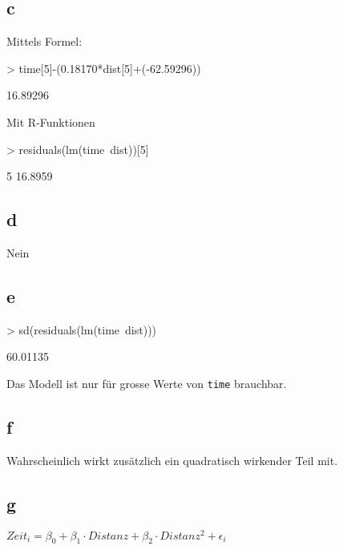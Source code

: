 \subsection{c}
Mittels Formel: 
\begin{Schunk}
\begin{Sinput}
> time[5]-(0.18170*dist[5]+(-62.59296))
\end{Sinput}
\begin{Soutput}
[1] 16.89296
\end{Soutput}
\end{Schunk}
Mit R-Funktionen
\begin{Schunk}
\begin{Sinput}
> residuals(lm(time~dist))[5]
\end{Sinput}
\begin{Soutput}
      5 
16.8959 
\end{Soutput}
\end{Schunk}

\subsection{d}
Nein

\subsection{e}
\begin{Schunk}
\begin{Sinput}
> sd(residuals(lm(time~dist)))
\end{Sinput}
\begin{Soutput}
[1] 60.01135
\end{Soutput}
\end{Schunk}
Das Modell ist nur für grosse Werte von \verb?time? brauchbar. 

\subsection{f}
Wahrscheinlich wirkt zusätzlich ein quadratisch wirkender Teil mit. 

\subsection{g}
$Zeit_i 
= \beta_0 + \beta_1 \cdot Distanz + \beta_2 \cdot Distanz^2 + \epsilon_i$
